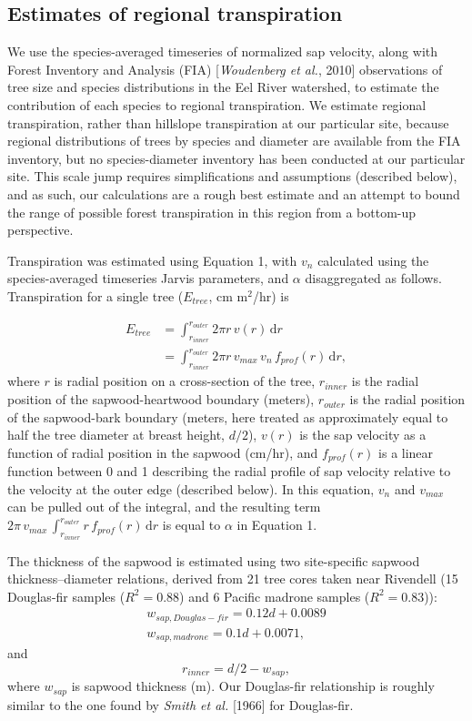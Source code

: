 \subsection{Estimates of regional transpiration}
We use the species-averaged timeseries of normalized sap velocity, along with Forest Inventory and Analysis (FIA) [\textit{Woudenberg et al.}, 2010] observations of tree size and species distributions in the Eel River watershed, to estimate the contribution of each species to regional transpiration.  We estimate regional transpiration, rather than hillslope transpiration at our particular site, because regional distributions of trees by species and diameter are available from the FIA inventory, but no species-diameter inventory has been conducted at our particular site.  This scale jump requires simplifications and assumptions (described below), and as such, our calculations are a rough best estimate and an attempt to bound the range of possible forest transpiration in this region from a bottom-up perspective.  

Transpiration was estimated using Equation 1, with $v_n$ calculated using the species-averaged timeseries Jarvis parameters, and $\alpha$ disaggregated as follows.  Transpiration for a single tree ($E_{tree}$, cm m$^2$/hr) is

\begin{align}
E_{tree} & = \int_{r_{inner}}^{r_{outer}} 2\pi r \, v(r) \, \mathrm{d}r \nonumber \\ 
& =  \int_{r_{inner}}^{r_{outer}}  2\pi r \, v_{max} \, v_{n} \, f_{prof}(r) \, \mathrm{d}r,
\end{align}
where $r$ is radial position on a cross-section of the tree, $r_{inner}$ is the radial position of the sapwood-heartwood boundary (meters), $r_{outer}$ is the radial position of the sapwood-bark boundary (meters, here treated as approximately equal to half the tree diameter at breast height, $d/2$), $v(r)$ is the sap velocity as a function of radial position in the sapwood (cm/hr), and $f_{prof}(r)$ is a linear function between 0 and 1 describing the radial profile of sap velocity relative to the velocity at the outer edge (described below).  In this equation, $v_n$ and $v_{max}$ can be pulled out of the integral, and the resulting term $2\pi \, v_{max} \, \int_{r_{inner}}^{r_{outer}}  r \, f_{prof}(r) \, \mathrm{d}r$ is equal to $\alpha$ in Equation 1.

The thickness of the sapwood is estimated using two site-specific sapwood thickness--diameter relations, derived from 21 tree cores taken near Rivendell (15 Douglas-fir samples ($R^2=0.88$) and 6 Pacific madrone samples ($R^2=0.83$)):
\begin{align}
w_{sap,Douglas-fir} = 0.12d+0.0089\\
w_{sap,madrone} = 0.1d+0.0071 ,
\end{align}
and
\begin{equation}
r_{inner} = d/2-w_{sap},
\end{equation}
where $w_{sap}$ is sapwood thickness (m).  Our Douglas-fir relationship is roughly similar to the one found by \textit{Smith et al.} [1966] for Douglas-fir.  

